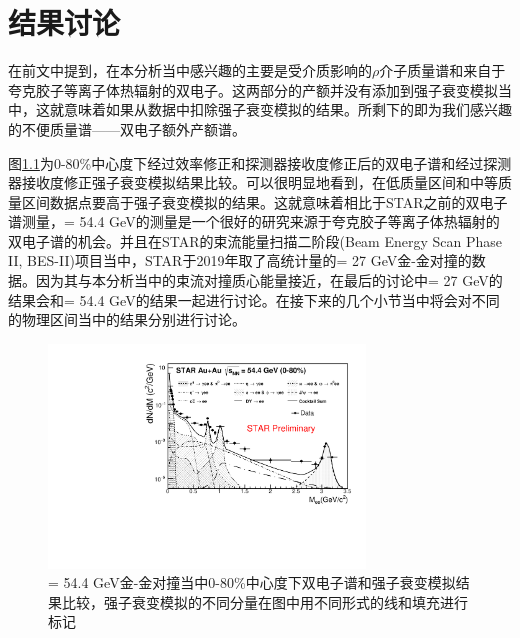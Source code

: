 

\setcounter{section}{0}

\setcounter{figure}{0}
\setcounter{table}{0}
\setcounter{equation}{0}

\chapter{结果讨论}

在前文中提到，在本分析当中感兴趣的主要是受介质影响的$\rho$介子质量谱和来自于夸克胶子等离子体热辐射的双电子。这两部分的产额并没有添加到强子衰变模拟当中，这就意味着如果从数据中扣除强子衰变模拟的结果。所剩下的即为我们感兴趣的不便质量谱——双电子额外产额谱。

图\ref{fig:Hm_fullCorr_vsCKTs_54GeV_icent0}为0-80\%中心度下经过效率修正和探测器接收度修正后的双电子谱和经过探测器接收度修正强子衰变模拟结果比较。可以很明显地看到，在低质量区间和中等质量区间数据点要高于强子衰变模拟的结果。这就意味着相比于STAR之前的双电子谱测量，\sNN = 54.4 GeV的测量是一个很好的研究来源于夸克胶子等离子体热辐射的双电子谱的机会。并且在STAR的束流能量扫描二阶段(Beam Energy Scan Phase II, BES-II)项目当中，STAR于2019年取了高统计量的\sNN = 27 GeV金-金对撞的数据。因为其与本分析当中的束流对撞质心能量接近，在最后的讨论中\sNN = 27 GeV的结果会和\sNN = 54.4 GeV的结果一起进行讨论。在接下来的几个小节当中将会对不同的物理区间当中的结果分别进行讨论。

\begin{figure}[htb]
    \begin{center}
    \includegraphics[width=0.75\textwidth,clip]{figures/Chapter4/Hm_fullCorr_vsCKTs_54GeV_icent0.pdf}
    \end{center}
    \caption[\sNN = 54.4 GeV金-金对撞当中0-80\%中心度下双电子谱和强子衰变模拟结果比较]{\sNN = 54.4 GeV金-金对撞当中0-80\%中心度下双电子谱和强子衰变模拟结果比较，强子衰变模拟的不同分量在图中用不同形式的线和填充进行标记}
    \label{fig:Hm_fullCorr_vsCKTs_54GeV_icent0}
\end{figure}

